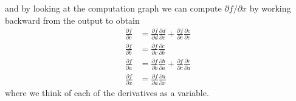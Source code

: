 \documentclass{report}
\begin{document}
\newpage
\noindent and by looking at the computation graph we can compute $\partial f/\partial x$ by working backward from the output
to obtain
\begin{align*}
\frac{\partial f}{\partial c}&=\frac{\partial f}{\partial d}
\frac{\partial d}{\partial c}
+\frac{\partial f}{\partial e}\frac{\partial e}{\partial c}\\
\frac{\partial f}{\partial b}&=\frac{\partial f}{\partial c}
\frac{\partial c}{\partial b}\\
\frac{\partial f}{\partial a}&=\frac{\partial f}{\partial b}
\frac{\partial b}{\partial a}+\frac{\partial f}{\partial c}
\frac{\partial c}{\partial a}\\
\frac{\partial f}{\partial x}&=\frac{\partial f}{\partial a}
\frac{\partial a}{\partial x}
\end{align*}
where we think of each of the derivatives as a variable.
\newpage

\subsection{}
\end{document}
